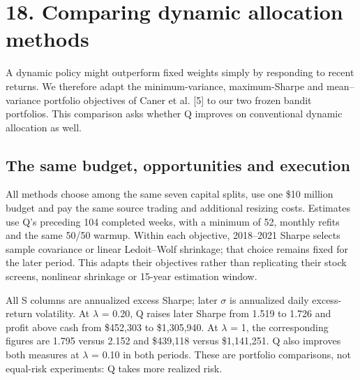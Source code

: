 \documentclass[11pt,letterpaper]{article}
\begin{document}
\clearpage
\section*{18. Comparing dynamic allocation methods}
A dynamic policy might outperform fixed weights simply by responding to recent returns. We therefore adapt the minimum-variance, maximum-Sharpe and mean--variance portfolio objectives of Caner et al. [5] to our two frozen bandit portfolios. This comparison asks whether Q improves on conventional dynamic allocation as well.

\subsection*{The same budget, opportunities and execution}
All methods choose among the same seven capital splits, use one \$10 million budget and pay the same source trading and additional resizing costs. Estimates use Q's preceding 104 completed weeks, with a minimum of 52, monthly refits and the same 50/50 warmup. Within each objective, 2018--2021 Sharpe selects sample covariance or linear Ledoit--Wolf shrinkage; that choice remains fixed for the later period. This adapts their objectives rather than replicating their stock screens, nonlinear shrinkage or 15-year estimation window.

\begin{center}\small{}\end{center}
All S columns are annualized excess Sharpe; later \ensuremath{\sigma} is annualized daily excess-return volatility. At \ensuremath{\lambda} = 0.20, Q raises later Sharpe from 1.519 to 1.726 and profit above cash from \$452,303 to \$1,305,940. At \ensuremath{\lambda} = 1, the corresponding figures are 1.795 versus 2.152 and \$439,118 versus \$1,141,251. Q also improves both measures at \ensuremath{\lambda} = 0.10 in both periods. These are portfolio comparisons, not equal-risk experiments: Q takes more realized risk.
\end{document}
